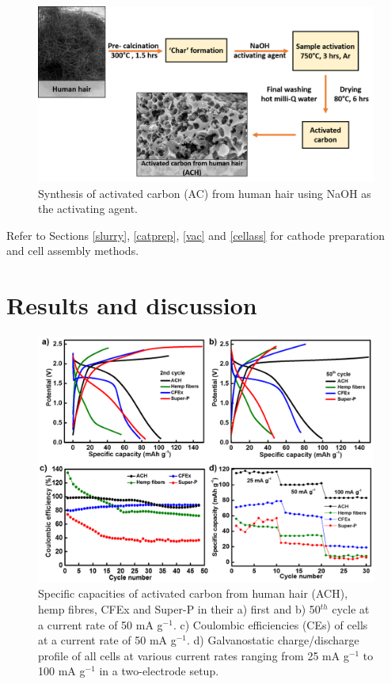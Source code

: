 \begin{figure}[h]
\centering
\includegraphics[width=35.5em]{Figures/chap5fig/achsyn}
\caption{Synthesis of activated carbon (AC) from human hair using NaOH as the activating agent.}
\label{Figures/chap5fig:achsyn}
\end{figure}
Refer to Sections \ref{slurry}, \ref{catprep}, \ref{vac} and \ref{cellass} for cathode preparation and cell assembly methods. 

\section{Results and discussion}

\begin{figure}[h]
  \centering
  \includegraphics[width=\textwidth]{Figures/chap5fig/cdcall}
    \caption{Specific capacities of activated carbon from human hair (ACH), hemp fibres, CFEx and Super-P in their a) first and b) 50$^{th}$ cycle at a current rate of 50 mA g$^{-1}$. c) Coulombic efficiencies (CEs) of cells at a current rate of 50 mA g$^{-1}$. d) Galvanostatic charge/discharge profile of all cells at various current rates ranging from 25 mA g$^{-1}$ to 100 mA g$^{-1}$ in a two-electrode setup.}
  \label{Figures/chap5fig:cdcall}
\end{figure}

